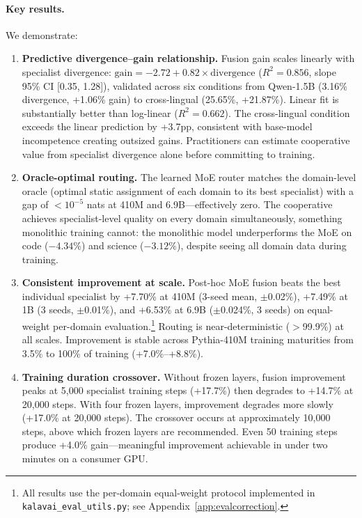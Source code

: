 \documentclass{article}
\begin{document}
\paragraph{Key results.} We demonstrate:
\begin{enumerate}[leftmargin=*, itemsep=2pt]
  \item \textbf{Predictive divergence--gain relationship.} Fusion gain scales linearly with specialist divergence: $\text{gain} = -2.72 + 0.82 \times \text{divergence}$ ($R^2 = 0.856$, slope 95\% CI [0.35, 1.28]), validated across six conditions from Qwen-1.5B (3.16\% divergence, +1.06\% gain) to cross-lingual (25.65\%, +21.87\%). Linear fit is substantially better than log-linear ($R^2 = 0.662$). The cross-lingual condition exceeds the linear prediction by +3.7pp, consistent with base-model incompetence creating outsized gains. Practitioners can estimate cooperative value from specialist divergence alone before committing to training.
  \item \textbf{Oracle-optimal routing.} The learned MoE router matches the domain-level oracle (optimal static assignment of each domain to its best specialist) with a gap of $<10^{-5}$ nats at 410M and 6.9B---effectively zero. The cooperative achieves specialist-level quality on every domain simultaneously, something monolithic training cannot: the monolithic model underperforms the MoE on code ($-4.34\%$) and science ($-3.12\%$), despite seeing all domain data during training.
  \item \textbf{Consistent improvement at scale.} Post-hoc MoE fusion beats the best individual specialist by +7.70\% at 410M (3-seed mean, $\pm$0.02\%), +7.49\% at 1B (3 seeds, $\pm$0.01\%), and +6.53\% at 6.9B ($\pm$0.024\%, 3 seeds) on equal-weight per-domain evaluation.\footnote{All results use the per-domain equal-weight protocol implemented in \texttt{kalavai\_eval\_utils.py}; see Appendix~\ref{app:evalcorrection}.} Routing is near-deterministic ($>$99.9\%) at all scales. Improvement is stable across Pythia-410M training maturities from 3.5\% to 100\% of training (+7.0\%--+8.8\%).
  \item \textbf{Training duration crossover.} Without frozen layers, fusion improvement peaks at 5,000 specialist training steps (+17.7\%) then degrades to +14.7\% at 20,000 steps. With four frozen layers, improvement degrades more slowly (+17.0\% at 20,000 steps). The crossover occurs at approximately 10,000 steps, above which frozen layers are recommended. Even 50 training steps produce +4.0\% gain---meaningful improvement achievable in under two minutes on a consumer GPU.

\end{enumerate}
\end{document}
